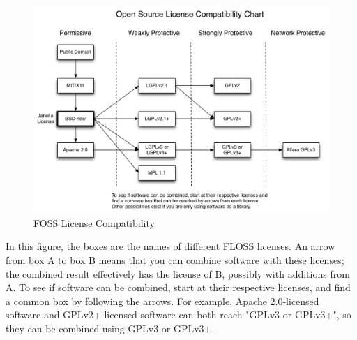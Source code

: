 \begin{figure}[ht]
	\centering
	\includegraphics[scale=0.4]{images/open_licenses.png}
	\caption{FOSS License Compatibility}\label{fig:foss-licenses}
\end{figure}

\begin{flushleft}
	In this figure, the boxes are the names of different FLOSS licenses. An arrow
	from box A to box B means that you can combine software with these licenses;
	the combined result effectively has the license of B, possibly with additions
	from A. To see if software can be combined, start at their respective
	licenses, and find a common box by following the arrows. For example, Apache 2.0-licensed
	software and GPLv2+-licensed software can both reach "GPLv3 or GPLv3+", so they
	can be combined using GPLv3 or GPLv3+.
\end{flushleft}
